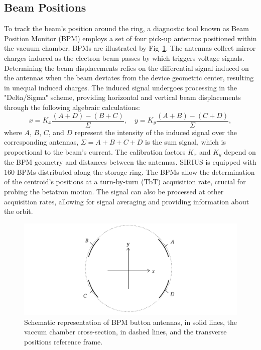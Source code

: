 \subsection{Beam Positions}
To track the beam's position around the ring, a diagnostic tool known as Beam Position Monitor (BPM) employs a set of four pick-up antennas positioned within the vacuum chamber. BPMs are illustrated by Fig~\ref{fig:bpms_scheme}. The antennas collect mirror charges induced as the electron beam passes by which triggers voltage signals. Determining the beam displacements relies on the differential signal induced on the antennas when the beam deviates from the device geometric center, resulting in unequal induced charges. The induced signal undergoes processing in the "Delta/Sigma" scheme, providing horizontal and vertical beam displacements through the following algebraic calculations:
\begin{equation}
    x = K_x \frac{(A+D)-(B+C)}{\Sigma}, \quad y = K_y \frac{(A+B)-(C+D)}{\Sigma},
\end{equation}
where $A$, $B$, $C$, and $D$ represent the intensity of the induced signal over the corresponding antennas, $\Sigma = A + B + C + D$ is the sum signal, which is proportional to the beam's current. The calibration factors $K_x$ and $K_y$ depend on the BPM geometry and distances between the antennas. SIRIUS is equipped with 160 BPMs distributed along the storage ring. The BPMs allow the determination of the centroid's positions at a turn-by-turn (TbT) acquisition rate, crucial for probing the betatron motion. The signal can also be processed at other acquisition rates, allowing for signal averaging and providing information about the orbit.
\begin{figure}
    \centering
    \includegraphics[width=\textwidth]{Images/bpm_scheme.pdf}
    \caption{Schematic representation of BPM button antennas, in solid lines, the vaccum chamber cross-section, in dashed lines, and the transverse positions reference frame.}
    \label{fig:bpms_scheme}
\end{figure}
